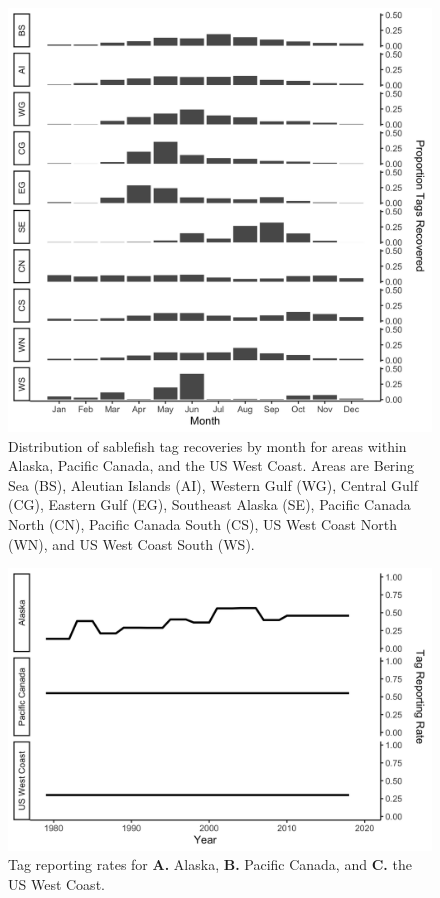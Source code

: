 \documentclass{article}
\begin{document}
\begin{figure}[htb]
    \centering
    \includegraphics[width = \textwidth]{figs/bar-capture-scale-area}
    \caption{Distribution of sablefish tag recoveries by month for areas within Alaska, Pacific Canada, and the US West Coast. Areas are Bering Sea (BS), Aleutian Islands (AI), Western Gulf (WG), Central Gulf (CG), Eastern Gulf (EG), Southeast Alaska (SE), Pacific Canada North (CN), Pacific Canada South (CS), US West Coast North (WN), and US West Coast South (WS).}
    \label{fig:bar-capture-scale-area}
\end{figure}

\begin{figure}[htb]
    \centering
    \includegraphics[width = \textwidth]{figs/line-report-ratio}
    \caption{Tag reporting rates for \textbf{A.} Alaska, \textbf{B.} Pacific Canada, and \textbf{C.} the US West Coast.}
    \label{fig:line-report-ratio}
\end{figure}
\end{document}
